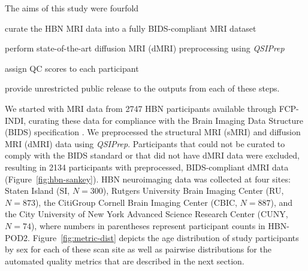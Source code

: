 \documentclass[fleqn,10pt,inline]{wlscirep}
\begin{document}
The aims of this study were fourfold
\begin{enumerate*}[%
    label=(\roman*),%
    before=\unskip{: },%
    itemjoin={{, }},%
    itemjoin*={{, and }}]
    \item curate the HBN MRI data into a fully BIDS-compliant MRI dataset
    \item perform state-of-the-art diffusion MRI (dMRI) preprocessing using \emph{QSIPrep}
    \item assign QC scores to each participant
    \item provide unrestricted public release to the outputs from each of these
    steps.
\end{enumerate*}
We started with MRI data from \num{2747} HBN participants available through FCP-INDI,
curating these data for compliance with the Brain Imaging Data Structure
(BIDS) specification \cite{gorgolewski2016-lh}. We  preprocessed the structural
MRI (sMRI) and diffusion MRI (dMRI) data using \emph{QSIPrep}. Participants that
could not be curated to comply with the BIDS standard or that did not have dMRI
data were excluded, resulting in \num{2134} participants with preprocessed,
BIDS-compliant dMRI data (Figure~\ref{fig:hbn-sankey}).
HBN neuroimaging data was collected at four sites: 
Staten Island (SI, $N=300$), Rutgers University Brain Imaging Center (RU, $N=873$), the CitiGroup Cornell Brain Imaging Center (CBIC, $N=887$), and the City University of New York Advanced Science Research Center (CUNY, $N=74$), where numbers in parentheses represent participant counts in HBN-POD2.
Figure~\ref{fig:metric-dist} depicts the age distribution of study participants by sex for each of these scan site as well as pairwise distributions for the automated quality metrics that are described in the next section.
\end{document}

